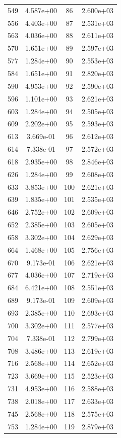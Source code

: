 \documentclass[12pt]{article}
\begin{document}
\begin{longtable}{@{}cccc@{}}
549 & 4.587e+00 & 86 & 2.600e+03 \\
556 & 4.403e+00 & 87 & 2.531e+03 \\
563 & 4.036e+00 & 88 & 2.611e+03 \\
570 & 1.651e+00 & 89 & 2.597e+03 \\
577 & 1.284e+00 & 90 & 2.553e+03 \\
584 & 1.651e+00 & 91 & 2.820e+03 \\
590 & 4.953e+00 & 92 & 2.590e+03 \\
596 & 1.101e+00 & 93 & 2.621e+03 \\
603 & 1.284e+00 & 94 & 2.505e+03 \\
609 & 2.202e+00 & 95 & 2.593e+03 \\
613 & 3.669e-01 & 96 & 2.612e+03 \\
614 & 7.338e-01 & 97 & 2.572e+03 \\
618 & 2.935e+00 & 98 & 2.846e+03 \\
626 & 1.284e+00 & 99 & 2.608e+03 \\
633 & 3.853e+00 & 100 & 2.621e+03 \\
639 & 1.835e+00 & 101 & 2.535e+03 \\
646 & 2.752e+00 & 102 & 2.609e+03 \\
652 & 2.385e+00 & 103 & 2.605e+03 \\
658 & 3.302e+00 & 104 & 2.629e+03 \\
664 & 1.468e+00 & 105 & 2.756e+03 \\
670 & 9.173e-01 & 106 & 2.621e+03 \\
677 & 4.036e+00 & 107 & 2.719e+03 \\
684 & 6.421e+00 & 108 & 2.551e+03 \\
689 & 9.173e-01 & 109 & 2.609e+03 \\
693 & 2.385e+00 & 110 & 2.693e+03 \\
700 & 3.302e+00 & 111 & 2.577e+03 \\
704 & 7.338e-01 & 112 & 2.799e+03 \\
708 & 3.486e+00 & 113 & 2.619e+03 \\
716 & 2.568e+00 & 114 & 2.652e+03 \\
723 & 3.669e+00 & 115 & 2.523e+03 \\
731 & 4.953e+00 & 116 & 2.588e+03 \\
738 & 2.018e+00 & 117 & 2.633e+03 \\
745 & 2.568e+00 & 118 & 2.575e+03 \\
753 & 1.284e+00 & 119 & 2.879e+03 \\

\end{longtable}
\end{document}
